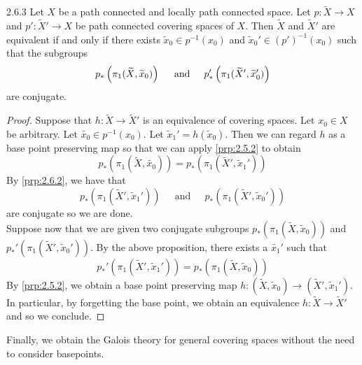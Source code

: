 \documentclass[a4paper]{article}
\begin{document}
\begin{prp}{}{2.6.3} Let $X$ be a path connected and locally path connected space. Let $p:\widetilde{X}\to X$ and $p':\widetilde{X}'\to X$ be path connected covering spaces of $X$. Then $\widetilde{X}$ and $\widetilde{X}'$ are equivalent if and only if there exists $\widetilde{x}_0\in p^{-1}(x_0)$ and $\widetilde{x}_0'\in (p')^{-1}(x_0)$ such that the subgroups $$p_\ast\left(\pi_1(\widetilde{X},\widetilde{x}_0)\right)\text{\;\;\;\; and \;\;\;\;}p_\ast'\left(\pi_1(\widetilde{X}',\widetilde{x}_0')\right)$$ are conjugate. 
\begin{proof}
Suppose that $h:\widetilde{X}\to\widetilde{X}'$ is an equivalence of covering spaces. Let $x_0\in X$ be arbitrary. Let $\widetilde{x_0}\in p^{-1}(x_0)$. Let $\widetilde{x}_1'=h(\widetilde{x}_0)$. Then we can regard $h$ as a base point preserving map so that we can apply \ref{prp:2.5.2} to obtain $$p_\ast(\pi_1(\widetilde{X},\widetilde{x_0}))=p_\ast(\pi_1(\widetilde{X}',\widetilde{x}_1'))$$ By \ref{prp:2.6.2}, we have that $$p_\ast(\pi_1(\widetilde{X}',\widetilde{x}_1'))\;\;\;\;\text{ and }\;\;\;\;p_\ast(\pi_1(\widetilde{X}',\widetilde{x}_0'))$$ are conjugate so we are done. \\

Suppose now that we are given two conjugate subgroups $p_\ast\left(\pi_1(\widetilde{X},\widetilde{x}_0)\right)$ and $p_\ast'\left(\pi_1(\widetilde{X}',\widetilde{x}_0')\right)$. By the above proposition, there exists a $\widetilde{x_1}'$ such that $$p_\ast'\left(\pi_1(\widetilde{X}',\widetilde{x}_1')\right)=p_\ast\left(\pi_1(\widetilde{X},\widetilde{x}_0)\right)$$ By \ref{prp:2.5.2}, we obtain a base point preserving map $h:(\widetilde{X},\widetilde{x}_0)\to(\widetilde{X}',\widetilde{x}_1')$. In particular, by forgetting the base point, we obtain an equivalence $h:\widetilde{X}\to\widetilde{X}'$ and so we conclude. 
\end{proof}
\end{prp}

Finally, we obtain the Galois theory for general covering spaces without the need to consider basepoints. 
\end{document}
